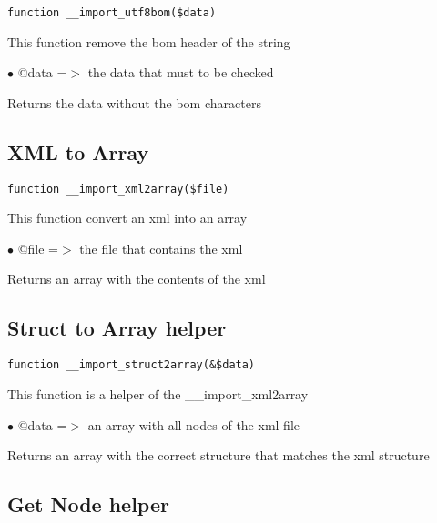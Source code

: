 \documentclass[a4paper]{book}
\begin{document}
\begin{lstlisting}
function __import_utf8bom($data)
\end{lstlisting}

This function remove the bom header of the string

\begin{compactitem}
\item[\color{myblue}$\bullet$] @data =$>$ the data that must to be checked
\end{compactitem}

Returns the data without the bom characters

\hypertarget{toc156}{}
\subsection{XML to Array}

\begin{lstlisting}
function __import_xml2array($file)
\end{lstlisting}

This function convert an xml into an array

\begin{compactitem}
\item[\color{myblue}$\bullet$] @file =$>$ the file that contains the xml
\end{compactitem}

Returns an array with the contents of the xml

\hypertarget{toc157}{}
\subsection{Struct to Array helper}

\begin{lstlisting}
function __import_struct2array(&$data)
\end{lstlisting}

This function is a helper of the \_\_import\_xml2array

\begin{compactitem}
\item[\color{myblue}$\bullet$] @data =$>$ an array with all nodes of the xml file
\end{compactitem}

Returns an array with the correct structure that matches the xml structure

\hypertarget{toc158}{}
\subsection{Get Node helper}
\end{document}
